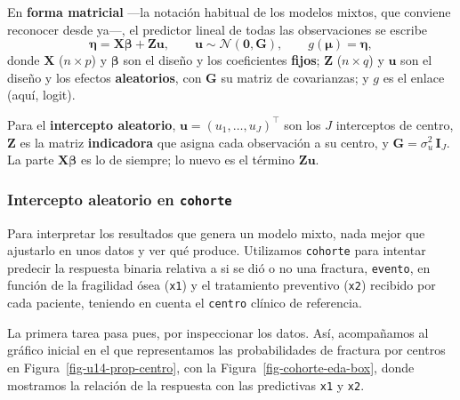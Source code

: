 \documentclass[
  letterpaper,
  DIV=11,
  numbers=noendperiod]{scrartcl}
\begin{document}
En \textbf{forma matricial} ---la notación habitual de los modelos
mixtos, que conviene reconocer desde ya---, el predictor lineal de todas
las observaciones se escribe \[
\boldsymbol\eta=\mathbf{X}\boldsymbol\beta+\mathbf{Z}\mathbf{u},\qquad
\mathbf{u}\sim\mathcal{N}(\mathbf{0},\mathbf{G}),\qquad g(\boldsymbol\mu)=\boldsymbol\eta,
\] donde \(\mathbf{X}\) (\(n\times p\)) y \(\boldsymbol\beta\) son el
diseño y los coeficientes \textbf{fijos}; \(\mathbf{Z}\) (\(n\times q\))
y \(\mathbf{u}\) son el diseño y los efectos \textbf{aleatorios}, con
\(\mathbf{G}\) su matriz de covarianzas; y \(g\) es el enlace (aquí,
logit).

Para el \textbf{intercepto aleatorio},
\(\mathbf{u}=(u_1,\dots,u_J)^\top\) son los \(J\) interceptos de centro,
\(\mathbf{Z}\) es la matriz \textbf{indicadora} que asigna cada
observación a su centro, y \(\mathbf{G}=\sigma_u^2\,\mathbf{I}_J\). La
parte \(\mathbf{X}\boldsymbol\beta\) es lo de siempre; lo nuevo es el
término \(\mathbf{Z}\mathbf{u}\).

\hypertarget{intercepto-aleatorio-en-cohorte}{%
\subsubsection{\texorpdfstring{Intercepto aleatorio en
\texttt{cohorte}}{Intercepto aleatorio en cohorte}}\label{intercepto-aleatorio-en-cohorte}}

Para interpretar los resultados que genera un modelo mixto, nada mejor
que ajustarlo en unos datos y ver qué produce. Utilizamos
\texttt{cohorte} para intentar predecir la respuesta binaria relativa a
si se dió o no una fractura, \texttt{evento}, en función de la
fragilidad ósea (\texttt{x1}) y el tratamiento preventivo (\texttt{x2})
recibido por cada paciente, teniendo en cuenta el \texttt{centro}
clínico de referencia.

La primera tarea pasa pues, por inspeccionar los datos. Así, acompañamos
al gráfico inicial en el que representamos las probabilidades de
fractura por centros en Figura~\ref{fig-u14-prop-centro}, con la
Figura~\ref{fig-cohorte-eda-box}, donde mostramos la relación de la
respuesta con las predictivas \texttt{x1} y \texttt{x2}.
\end{document}
